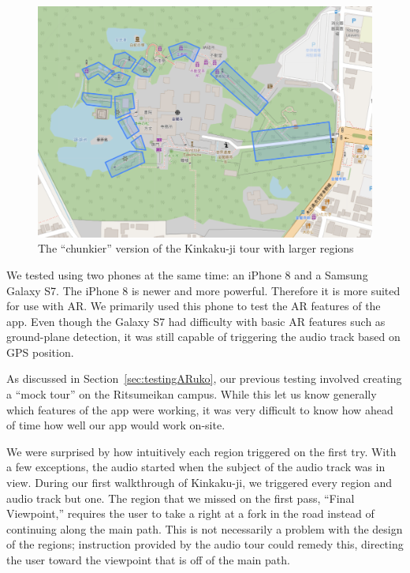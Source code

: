 \documentclass[a4paper, 10pt, american, titlepage]{article}
\begin{document}
\begin{figure}[p]
	\centering
	\includegraphics[width=\textwidth]{kinkakuji-chunkier-tour.png}
	\caption[The ``chunkier'' version of the Kinkaku-ji tour]{The ``chunkier''
		version of the Kinkaku-ji tour with larger regions}
	\label{fig:kinkakujiChunkierTour}
\end{figure}

We tested using two phones at the same time: an iPhone 8 and a Samsung Galaxy
S7. The iPhone 8 is newer and more powerful. Therefore it is more suited for use
with AR. We primarily used this phone to test the AR features of the app. Even
though the Galaxy S7 had difficulty with basic AR features such as ground-plane
detection, it was still capable of triggering the audio track based on GPS
position.

As discussed in Section~\ref{sec:testingARuko}, our previous testing involved
creating a ``mock tour'' on the Ritsumeikan campus. While this let us know
generally which features of the app were working, it was very difficult to know
how ahead of time how well our app would work on-site.

We were surprised by how intuitively each region triggered on the first try.
With a few exceptions, the audio started when the subject of the audio track
was in view. During our first walkthrough of Kinkaku-ji, we triggered every
region and audio track but one. The region that we missed on the first pass,
``Final Viewpoint,'' requires the user to take a right at a fork in the road
instead of continuing along the main path. This is not necessarily a problem
with the design of the regions; instruction provided by the audio tour could
remedy this, directing the user toward the viewpoint that is off of the main
path.
\end{document}
